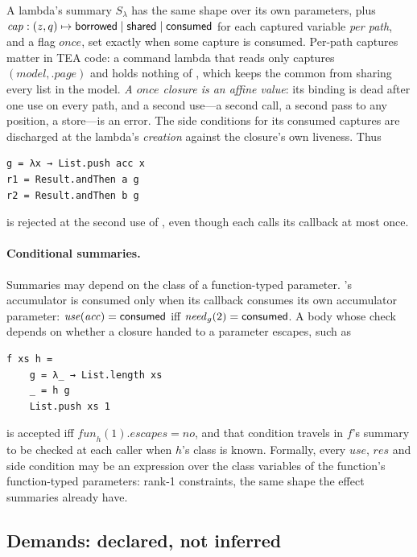 A lambda's summary $S_\lambda$ has the same shape over its own parameters, plus
$\mathit{cap} : (z, q) \mapsto \mathsf{borrowed} \mid \mathsf{shared} \mid \mathsf{consumed}$ for each captured variable
\emph{per path}, and a flag $\mathit{once}$, set exactly when some capture is consumed. Per-path
captures matter in TEA code: a command lambda that reads only  captures
$(\mathit{model}, .\mathit{page})$ and holds nothing of , which keeps the common
 from sharing every
list in the model. \emph{A $\mathit{once}$ closure is an affine value}: its binding is dead after one
use on every path, and a second use---a second call, a second pass to any position, a store---is an
error. The side conditions for its consumed captures are discharged at the lambda's \emph{creation}
against the closure's own liveness. Thus
\begin{Verbatim}
g = λx → List.push acc x
r1 = Result.andThen a g
r2 = Result.andThen b g
\end{Verbatim}
is rejected at the second use of , even though each  calls its callback
at most once.

\paragraph{Conditional summaries.} Summaries may depend on the class of a function-typed parameter.
's accumulator is consumed only when its callback consumes its own accumulator
parameter: $\mathit{use}(\mathit{acc}) = \mathsf{consumed}$ iff $\mathit{need}_g(2) = \mathsf{consumed}$. A body whose
check depends on whether a closure handed to a parameter escapes, such as
\begin{Verbatim}
f xs h =
    g = λ_ → List.length xs
    _ = h g
    List.push xs 1
\end{Verbatim}
is accepted iff $\mathit{fun}_h(1).\mathit{escapes} = \mathit{no}$, and that condition travels in
$f$'s summary to be checked at each caller when $h$'s class is known. Formally, every $\mathit{use}$,
$\mathit{res}$ and side condition may be an expression over the class variables of the function's
function-typed parameters: rank-1 constraints, the same shape the effect summaries already have.

\subsection{Demands: declared, not inferred}
\label{sec:model-demands}

